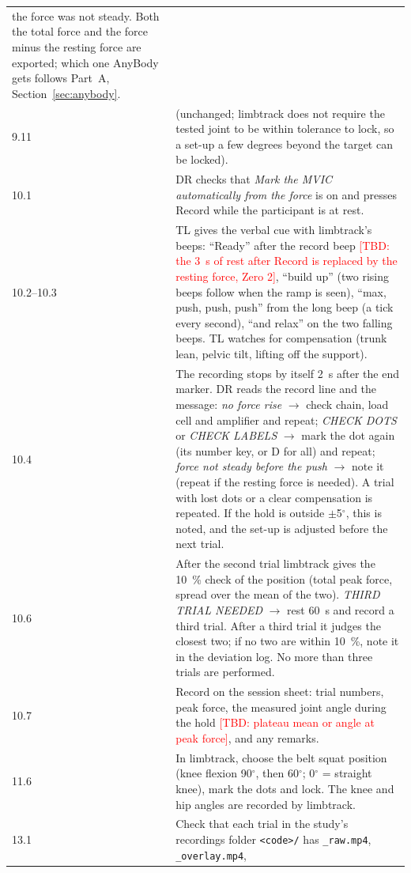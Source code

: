 \documentclass[a4paper,10pt]{article}
\newcommand{\lt}{\textsf{limbtrack}}
\newcommand{\code}[1]{\texttt{#1}}
\newcommand{\dg}{\ensuremath{^\circ}}
\newcommand{\tbd}[1]{\textcolor{red}{[TBD: #1]}}
\begin{document}
\begin{longtable}{@{}P{2.2cm}p{14.3cm}@{}}
  the force was not steady. Both the total force and the force minus the resting force are exported; which one AnyBody gets
  follows Part~A, Section~\ref{sec:anybody}. \\
9.11 & (unchanged; \lt{} does not require the tested joint to be within tolerance to lock, so a set-up a few degrees beyond the target
  can be locked). \\
10.1 & DR checks that \emph{Mark the MVIC automatically from the force} is on and presses Record while the participant is at rest. \\
10.2--10.3 & TL gives the verbal cue with \lt{}'s beeps: ``Ready'' after the record beep \tbd{the 3~s of rest after Record is replaced by the resting force, Zero 2}, ``build up'' (two rising beeps
  follow when the ramp is seen), ``max, push, push, push'' from the long beep (a tick every second), ``and relax'' on the two falling beeps.
  TL watches for compensation (trunk lean, pelvic tilt, lifting off the support). \\
10.4 & The recording stops by itself 2~s after the end marker. DR reads the record line and the message: \emph{no force rise} $\rightarrow$
  check chain, load cell and amplifier and repeat; \emph{CHECK DOTS} or \emph{CHECK LABELS} $\rightarrow$ mark the dot again (its number
  key, or D for all) and repeat; \emph{force not steady before the push} $\rightarrow$ note it (repeat if the resting force is needed). A trial with lost
  dots or a clear compensation is repeated. If the hold is outside $\pm$5\dg, this is noted, and the set-up is adjusted before the next
  trial. \\
10.6 & After the second trial \lt{} gives the 10~\% check of the position (total peak force, spread over the mean of the two). \emph{THIRD
  TRIAL NEEDED} $\rightarrow$ rest 60~s and record a third trial. After a third trial it judges the closest two; if no two are within
  10~\%, note it in the deviation log. No more than three trials are performed. \\
10.7 & Record on the session sheet: trial numbers, peak force, the measured joint angle during the hold \tbd{plateau mean or angle at
  peak force}, and any remarks. \\
11.6 & In \lt{}, choose the belt squat position (knee flexion 90\dg, then 60\dg; 0\dg{} = straight knee), mark the dots and lock. The
  knee and hip angles are recorded by \lt{}. \\
13.1 & Check that each trial in the study's recordings folder \code{<code>/} has \code{\_raw.mp4}, \code{\_overlay.mp4},

\end{longtable}
\end{document}
